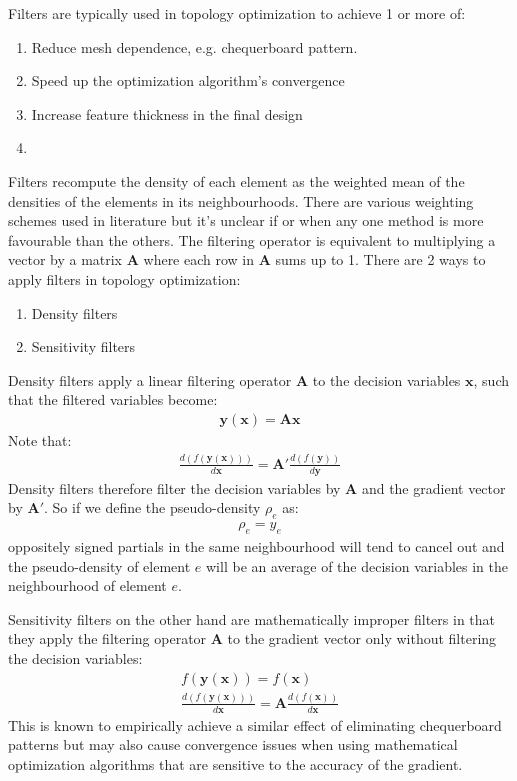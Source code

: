 Filters are typically used in topology optimization to achieve 1 or more of:
\begin{enumerate}
    \item Reduce mesh dependence, e.g. chequerboard pattern.
    \item Speed up the optimization algorithm's convergence
    \item Increase feature thickness in the final design
    \item 
\end{enumerate}
Filters recompute the density of each element as the weighted mean of the densities of the elements in its neighbourhoods. There are various weighting schemes used in literature but it's unclear if or when any one method is more favourable than the others. The filtering operator is equivalent to multiplying a vector by a matrix $\bm{A}$ where each row in $\bm{A}$ sums up to 1. There are 2 ways to apply filters in topology optimization:
\begin{enumerate}
    \item Density filters
    \item Sensitivity filters
\end{enumerate}
Density filters apply a linear filtering operator $\bm{A}$ to the decision variables $\bm{x}$, such that the filtered variables become:
\begin{align}
    \bm{y}(\bm{x}) = \bm{A} \bm{x}
\end{align}
Note that:
\begin{align}
    \frac{d(f(\bm{y}(\bm{x})))}{d\bm{x}} = \bm{A}' \frac{d(f(\bm{y}))}{d\bm{y}}
\end{align}
Density filters therefore filter the decision variables by $\bm{A}$ and the gradient vector by $\bm{A}'$. So if we define the pseudo-density $\rho_e$ as:
\begin{align}
    \rho_e = y_e
\end{align}
oppositely signed partials in the same neighbourhood will tend to cancel out and the pseudo-density of element $e$ will be an average of the decision variables in the neighbourhood of element $e$.

Sensitivity filters on the other hand are mathematically improper filters in that they apply the filtering operator $\bm{A}$ to the gradient vector only without filtering the decision variables:
\begin{align}
    f(\bm{y}(\bm{x})) = f(\bm{x}) \\
    \frac{d(f(\bm{y}(\bm{x})))}{d\bm{x}} = \bm{A} \frac{d(f(\bm{x}))}{d\bm{x}}
\end{align}
This is known to empirically achieve a similar effect of eliminating chequerboard patterns but may also cause convergence issues when using mathematical optimization algorithms that are sensitive to the accuracy of the gradient.

